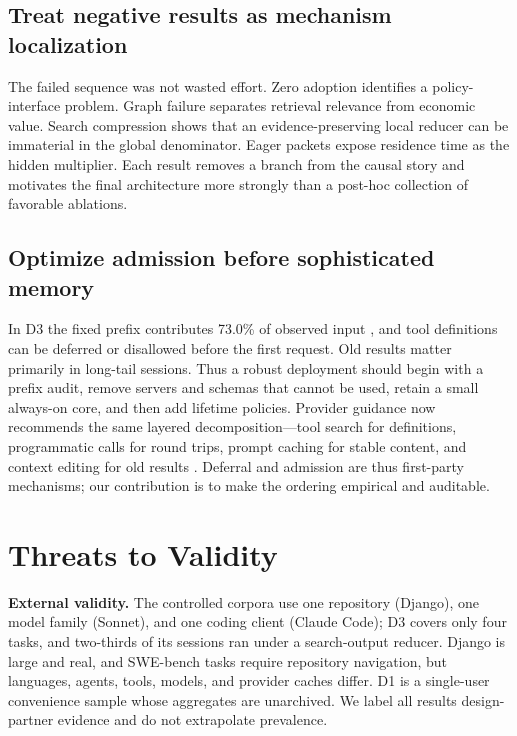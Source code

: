 \documentclass[10pt,twocolumn]{article}
\begin{document}
\subsection{Treat negative results as mechanism localization}

The failed sequence was not wasted effort.  Zero adoption identifies a policy-interface problem.
Graph failure separates retrieval relevance from economic value.  Search compression shows that an
evidence-preserving local reducer can be immaterial in the global denominator.  Eager packets expose
residence time as the hidden multiplier.  Each result removes a branch from the causal story and motivates the final
architecture more strongly than a post-hoc collection of favorable ablations.

\subsection{Optimize admission before sophisticated memory}

In D3 the fixed prefix contributes 73.0\% of observed input \tokensturns, and tool definitions can be
deferred or disallowed before the first request.  Old results matter primarily in long-tail sessions.
Thus a robust deployment should begin with a prefix audit, remove servers and schemas that cannot be
used, retain a small always-on core, and then add lifetime policies.  Provider guidance now recommends
the same layered decomposition---tool search for definitions, programmatic calls for round trips,
prompt caching for stable content, and context editing for old results
\cite{anthropicToolContext,anthropicToolSearch,anthropicContextEditing}.  Deferral and admission are
thus first-party mechanisms; our contribution is to make the ordering empirical and auditable.

\section{Threats to Validity}

\textbf{External validity.}  The controlled corpora use one repository (Django), one model family
(Sonnet), and one coding client (Claude Code); D3 covers only four tasks, and two-thirds of its
sessions ran under a search-output reducer.  Django is large and real, and SWE-bench tasks require
repository navigation, but languages, agents, tools, models, and provider caches differ.  D1 is a
single-user convenience sample whose aggregates are unarchived.  We label all results design-partner
evidence and do not extrapolate prevalence.
\end{document}

